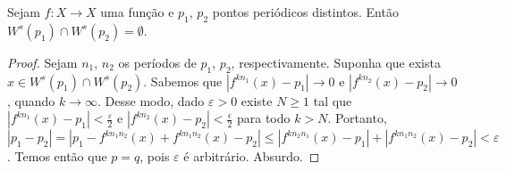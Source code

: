\begin{proposition}
Sejam $f: X \to X$ uma função e $p_1$, $p_2$ pontos periódicos distintos. Então $W^s(p_1) \cap W^s(p_2) = \emptyset$.
\end{proposition}

\begin{proof}
Sejam $n_1$, $n_2$ os períodos de $p_1$, $p_2$, respectivamente. Suponha que exista $x \in W^s(p_1) \cap W^s(p_2)$. Sabemos que $|f^{kn_1}(x) - p_1| \to 0$ e $|f^{kn_2}(x) - p_2| \to 0$, quando $k \to \infty$. Desse modo, dado $\varepsilon > 0$ existe $N \geq 1$ tal que $|f^{kn_1}(x) - p_1| < \frac{\varepsilon}{2}$ e $|f^{kn_2}(x) - p_2| < \frac{\epsilon}{2}$ para todo $k > N$. Portanto, $|p_1 - p_2| = |p_1 - f^{kn_1n_2}(x) + f^{kn_1n_2}(x) - p_2| \leq |f^{kn_2n_1}(x) - p_1| + |f^{kn_1n_2}(x) - p_2| < \varepsilon$. Temos então que $p = q$, pois $\varepsilon$ é arbitrário. Absurdo.
\end{proof}

